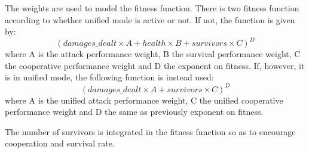The weights are used to model the fitness function. There is two fitness function
according to whether unified mode is active or not.
If not, the function is given by:
\[(damages\_dealt × A + health × B + survivors × C)^D\]
where A is the attack performance weight, B the survival performance weight, C the
cooperative performance weight and D the exponent on fitness.
If, however, it is in unified mode, the following function is instead used:
\[(damages\_dealt × A + survivors × C)^D\]
where A is the unified attack performance weight, C the unified cooperative performance
weight and D the same as previously exponent on fitness.

The number of survivors is integrated in the fitness function so as to encourage
cooperation and survival rate.

